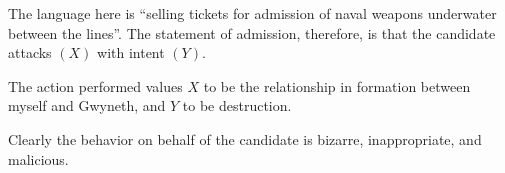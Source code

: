 

The language here is ``selling tickets for admission of naval weapons
underwater between the lines''.  The statement of admission,
therefore, is that the candidate attacks $(X)$ with intent $(Y)$.

The action performed values $X$ to be the relationship in formation
between myself and Gwyneth, and $Y$ to be destruction.

Clearly the behavior on behalf of the candidate is bizarre,
inappropriate, and malicious.

\bye
